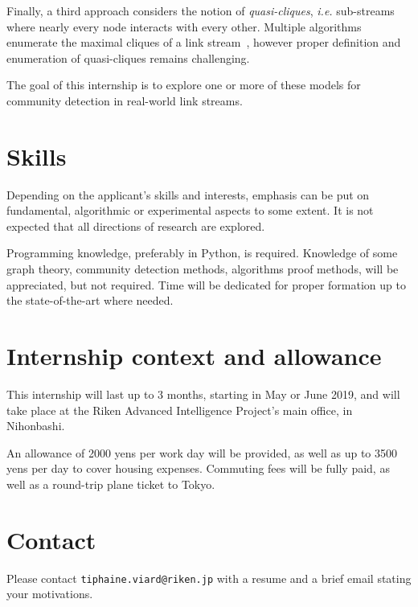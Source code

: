 \documentclass[a4paper, 12pt]{article}
\begin{document}
Finally, a third approach considers the notion of {\em quasi-cliques}, {\em i.e.} sub-streams where nearly every node interacts with every other.
Multiple algorithms enumerate the maximal cliques of a link stream~\cite{}, however proper definition and enumeration of quasi-cliques remains challenging.

The goal of this internship is to explore one or more of these models for community detection in real-world link streams.

\section{Skills}

Depending on the applicant's skills and interests, emphasis can be put on fundamental, algorithmic or experimental aspects to some extent.
It is not expected that all directions of research are explored.

Programming knowledge, preferably in Python, is required.
Knowledge of some graph theory, community detection methods, algorithms proof methods, will be appreciated, but not required. Time will be dedicated for proper formation up to the state-of-the-art where needed.

\section{Internship context and allowance}

This internship will last up to 3 months, starting in May or June 2019, and will take place at the Riken Advanced Intelligence Project's main office, in Nihonbashi.

An allowance of 2000 yens per work day will be provided, as well as up to 3500 yens per day to cover housing expenses.
Commuting fees will be fully paid, as well as a round-trip plane ticket to Tokyo.


\section{Contact}

Please contact \texttt{tiphaine.viard@riken.jp} with a resume and a brief email stating your motivations.
\end{document}
